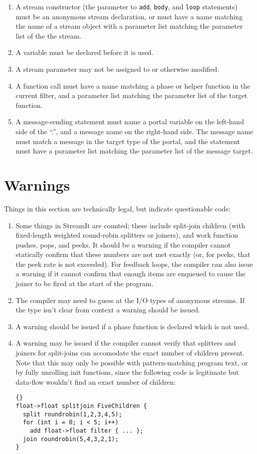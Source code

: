 \documentclass[11pt]{article}
\begin{document}
\begin{enumerate}
\item A stream constructor (the parameter to \lstinline|add|,
  \lstinline|body|, and \lstinline|loop| statements) must be an
  anonymous stream declaration, or must have a name matching the name
  of a stream object with a parameter list matching the parameter list
  of  the the stream.
\item A variable must be declared before it is used.
\item A stream parameter may not be assigned to or otherwise modified.
\item A function call must have a name matching a phase or helper
  function in the current filter, and a parameter list matching the
  parameter list of the target function.
\item A message-sending statement must name a portal variable on the
  left-hand side of the ``.'', and a message name on the right-hand
  side.  The message name must match a message in the target type of
  the portal, and the statement must have a parameter list matching
  the parameter list of the message target.
\end{enumerate}

\section{Warnings}

Things in this section are technically legal, but indicate
questionable code:

\begin{enumerate}
\item Some things in StreamIt are counted; these include split-join
  children (with fixed-length weighted round-robin splitters or
  joiners), and work function pushes, pops, and peeks.  It should be a
  warning if the compiler cannot statically confirm that these numbers
  are not met exactly (or, for peeks, that the peek rate is not
  exceeded).   For feedback loops, the compiler can also issue a
  warning if it cannot confirm that enough items are enqueued to cause
  the joiner to be fired at the start of the program.
\item The compiler may need to guess at the I/O types of anonymous
  streams.  If the type isn't clear from context a warning should be
  issued.
\item A warning should be issued if a phase function is declared which
  is not used.
\item A warning may be issued if the compiler cannot verify that
  splitters and joiners for split-joins can accomodate the exact
  number of children present.  Note that this may only be possible
  with pattern-matching program text, or by fully unrolling init
  functions, since the following code is legitimate but data-flow
  wouldn't find an exact number of children:

\begin{lstlisting}{}
float->float splitjoin FiveChildren {
  split roundrobin(1,2,3,4,5);
  for (int i = 0; i < 5; i++)
    add float->float filter { ... };
  join roundrobin(5,4,3,2,1);
}
\end{lstlisting}
\end{enumerate}
\end{document}
